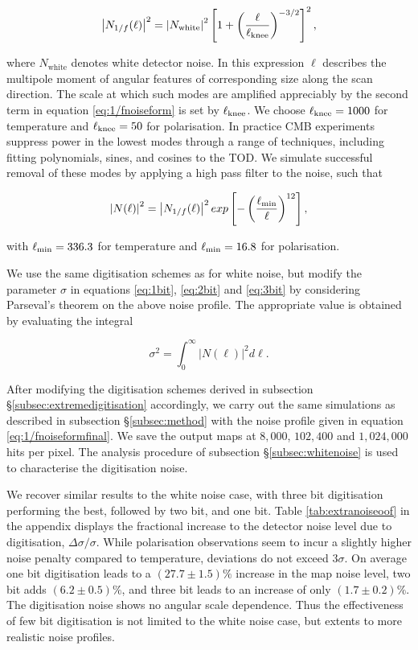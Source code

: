 \documentclass[apj]{emulateapj}
\newcommand{\lknee}{\ensuremath{\ell_{\rm knee}}}
\newcommand{\lcut}{\ensuremath{\ell_{\rm min}}}
\begin{document}
\begin{equation} \label{eq:1/fnoiseform}
\left| N_{1/f}(\ell) \right|^2 = \left| N_{\mathrm{white}} \right|^2 \left[ 1 + \left( \frac{\ell}{\lknee} \right)^{-3/2} \right]^2,
\end{equation}


where $N_{\mathrm{white}}$ denotes white detector noise. In this expression $\ell$ describes the multipole moment of angular features of corresponding size along the scan direction. The scale at which such modes are amplified appreciably by the second term in equation \ref{eq:1/fnoiseform} is set by $\lknee$. We choose $\lknee = 1000$ for temperature and $\lknee = 50$ for polarisation. In practice CMB experiments suppress power in the lowest modes through a range of techniques, including fitting polynomials, sines, and cosines to the TOD. We simulate successful removal of these modes by applying a high pass filter to the noise, such that

\begin{equation} \label{eq:1/fnoiseformfinal}
\left| N (\ell) \right|^2 = \left| N_{1/f}(\ell) \right|^2 exp\left[ -\left( \frac{\lcut}{\ell} \right)^{12} \right],
\end{equation}

with $\lcut = 336.3$ for temperature and $\lcut = 16.8$ for polarisation.

We use the same digitisation schemes as for white noise, but modify the parameter $\sigma$ in equations \ref{eq:1bit}, \ref{eq:2bit} and \ref{eq:3bit} by considering Parseval's theorem on the above noise profile. The appropriate value is obtained by evaluating the integral

\begin{equation} \label{eq:psvl1/f}
\sigma^2 = \int_0^\infty \left| N(\ell) \right|^2 d\ell.
\end{equation}

After modifying the digitisation schemes derived in subsection \S\ref{subsec:extremedigitisation} accordingly, we carry out the same simulations as described in subsection \S\ref{subsec:method} with the noise profile given in equation \ref{eq:1/fnoiseformfinal}. We save the output maps at $8,000$, $102,400$ and $1,024,000$ hits per pixel. The analysis procedure of subsection \S\ref{subsec:whitenoise} is used to characterise the digitisation noise.

We recover similar results to the white noise case, with three bit digitisation performing the best, followed by two bit, and one bit. Table \ref{tab:extranoiseoof} in the appendix displays the fractional increase to the detector noise level due to digitisation, $\Delta \sigma / \sigma$. While polarisation observations seem to incur a slightly higher noise penalty compared to temperature, deviations do not exceed $3\sigma$. On average one bit digitisation leads to a $(27.7\pm 1.5)\%$ increase in the map noise level, two bit adds $(6.2\pm0.5)\%$, and three bit leads to an increase of only $(1.7\pm0.2)\%$. The digitisation noise shows no angular scale dependence. Thus the effectiveness of few bit digitisation is not limited to the white noise case, but extents to more realistic noise profiles.
\end{document}
